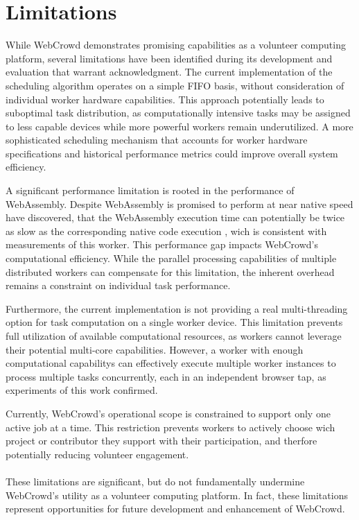 \section{Limitations}
\label{sec:conclusion:limitations}
While WebCrowd demonstrates promising capabilities as a volunteer computing platform, several limitations have been identified during its development and evaluation that warrant acknowledgment. The current implementation of the scheduling algorithm operates on a simple \ac{FIFO} basis, without consideration of individual worker hardware capabilities. This approach potentially leads to suboptimal task distribution, as computationally intensive tasks may be assigned to less capable devices while more powerful workers remain underutilized. A more sophisticated scheduling mechanism that accounts for worker hardware specifications and historical performance metrics could improve overall system efficiency.

A significant performance limitation is rooted in the performance of WebAssembly. Despite WebAssembly is promised to perform at near native speed \citeauthor{background:not-so-fast} have discovered, that the WebAssembly execution time can potentially be twice as slow as the corresponding native code execution \cite{background:not-so-fast}, wich is consistent with measurements of this worker. This performance gap impacts WebCrowd's computational efficiency. While the parallel processing capabilities of multiple distributed workers can compensate for this limitation, the inherent overhead remains a constraint on individual task performance.

Furthermore, the current implementation is not providing a real multi-threading option for task computation on a single worker device. This limitation prevents full utilization of available computational resources, as workers cannot leverage their potential multi-core capabilities. However, a worker with enough computational capabilitys can effectively execute multiple worker instances to process multiple tasks concurrently, each in an independent browser tap, as experiments of this work confirmed.

Currently, WebCrowd's operational scope is constrained to support only one active job at a time. This restriction prevents workers to actively choose wich project or contributor they support with their participation, and therfore potentially reducing volunteer engagement.
\\~\\
These limitations are significant, but do not fundamentally undermine WebCrowd's utility as a volunteer computing platform. In fact, these limitations represent opportunities for future development and enhancement of WebCrowd.


